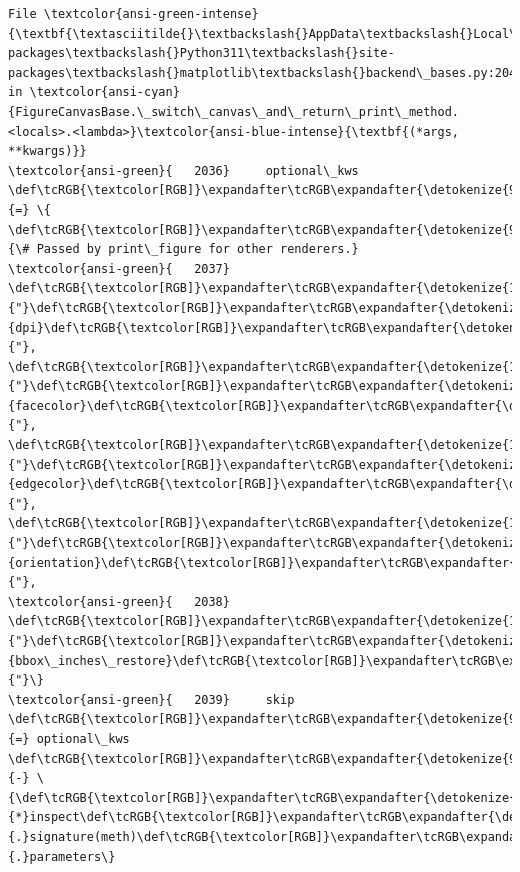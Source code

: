 \documentclass[11pt]{article}
\begin{document}
\begin{Verbatim}[commandchars=\\\{\}, frame=single, framerule=2mm, rulecolor=\color{outerrorbackground}]
File \textcolor{ansi-green-intense}{\textbf{\textasciitilde{}\textbackslash{}AppData\textbackslash{}Local\textbackslash{}Packages\textbackslash{}PythonSoftwareFoundation.Python.3.11\_qbz5n2kfra8p0\textbackslash{}LocalCache\textbackslash{}local-packages\textbackslash{}Python311\textbackslash{}site-packages\textbackslash{}matplotlib\textbackslash{}backend\_bases.py:2040}}, in \textcolor{ansi-cyan}{FigureCanvasBase.\_switch\_canvas\_and\_return\_print\_method.<locals>.<lambda>}\textcolor{ansi-blue-intense}{\textbf{(*args, **kwargs)}}
\textcolor{ansi-green}{   2036}     optional\_kws \def\tcRGB{\textcolor[RGB]}\expandafter\tcRGB\expandafter{\detokenize{98,98,98}}{=} \{  \def\tcRGB{\textcolor[RGB]}\expandafter\tcRGB\expandafter{\detokenize{95,135,135}}{\# Passed by print\_figure for other renderers.}
\textcolor{ansi-green}{   2037}         \def\tcRGB{\textcolor[RGB]}\expandafter\tcRGB\expandafter{\detokenize{175,0,0}}{"}\def\tcRGB{\textcolor[RGB]}\expandafter\tcRGB\expandafter{\detokenize{175,0,0}}{dpi}\def\tcRGB{\textcolor[RGB]}\expandafter\tcRGB\expandafter{\detokenize{175,0,0}}{"}, \def\tcRGB{\textcolor[RGB]}\expandafter\tcRGB\expandafter{\detokenize{175,0,0}}{"}\def\tcRGB{\textcolor[RGB]}\expandafter\tcRGB\expandafter{\detokenize{175,0,0}}{facecolor}\def\tcRGB{\textcolor[RGB]}\expandafter\tcRGB\expandafter{\detokenize{175,0,0}}{"}, \def\tcRGB{\textcolor[RGB]}\expandafter\tcRGB\expandafter{\detokenize{175,0,0}}{"}\def\tcRGB{\textcolor[RGB]}\expandafter\tcRGB\expandafter{\detokenize{175,0,0}}{edgecolor}\def\tcRGB{\textcolor[RGB]}\expandafter\tcRGB\expandafter{\detokenize{175,0,0}}{"}, \def\tcRGB{\textcolor[RGB]}\expandafter\tcRGB\expandafter{\detokenize{175,0,0}}{"}\def\tcRGB{\textcolor[RGB]}\expandafter\tcRGB\expandafter{\detokenize{175,0,0}}{orientation}\def\tcRGB{\textcolor[RGB]}\expandafter\tcRGB\expandafter{\detokenize{175,0,0}}{"},
\textcolor{ansi-green}{   2038}         \def\tcRGB{\textcolor[RGB]}\expandafter\tcRGB\expandafter{\detokenize{175,0,0}}{"}\def\tcRGB{\textcolor[RGB]}\expandafter\tcRGB\expandafter{\detokenize{175,0,0}}{bbox\_inches\_restore}\def\tcRGB{\textcolor[RGB]}\expandafter\tcRGB\expandafter{\detokenize{175,0,0}}{"}\}
\textcolor{ansi-green}{   2039}     skip \def\tcRGB{\textcolor[RGB]}\expandafter\tcRGB\expandafter{\detokenize{98,98,98}}{=} optional\_kws \def\tcRGB{\textcolor[RGB]}\expandafter\tcRGB\expandafter{\detokenize{98,98,98}}{-} \{\def\tcRGB{\textcolor[RGB]}\expandafter\tcRGB\expandafter{\detokenize{98,98,98}}{*}inspect\def\tcRGB{\textcolor[RGB]}\expandafter\tcRGB\expandafter{\detokenize{98,98,98}}{.}signature(meth)\def\tcRGB{\textcolor[RGB]}\expandafter\tcRGB\expandafter{\detokenize{98,98,98}}{.}parameters\}

\end{Verbatim}
\end{document}
